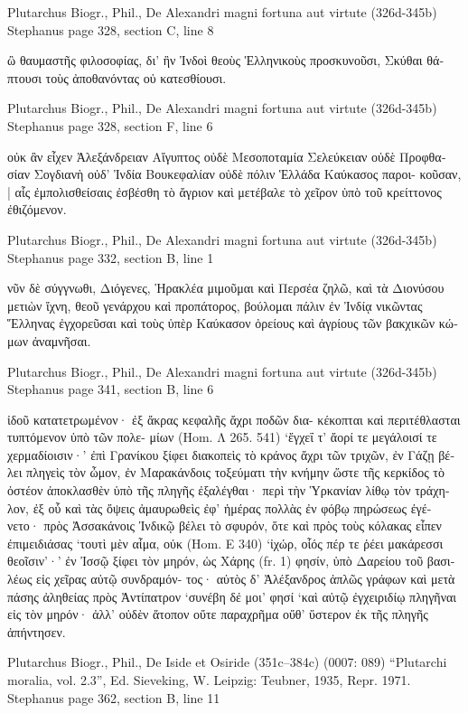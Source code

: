 \documentclass[12pt,letterpaper,twoside,final]{memoir}
\begin{document}
\begin{greek}
Plutarchus Biogr., Phil., De Alexandri magni fortuna aut virtute (326d-345b) 
Stephanus page 328, section C, line 8

             ὢ θαυμαστῆς φιλοσοφίας, δι' ἣν Ἰνδοὶ 
θεοὺς Ἑλληνικοὺς προσκυνοῦσι, Σκύθαι θάπτουσι τοὺς 
ἀποθανόντας οὐ κατεσθίουσι. 



Plutarchus Biogr., Phil., De Alexandri magni fortuna aut virtute (326d-345b) 
Stephanus page 328, section F, line 6

οὐκ ἂν εἶχεν Ἀλεξάνδρειαν Αἴγυπτος οὐδὲ Μεσοποταμία 
Σελεύκειαν οὐδὲ Προφθασίαν Σογδιανὴ οὐδ' Ἰνδία   
Βουκεφαλίαν οὐδὲ πόλιν Ἑλλάδα Καύκασος παροι-
κοῦσαν, | αἷς ἐμπολισθείσαις ἐσβέσθη τὸ ἄγριον καὶ 
μετέβαλε τὸ χεῖρον ὑπὸ τοῦ κρείττονος ἐθιζόμενον. 



Plutarchus Biogr., Phil., De Alexandri magni fortuna aut virtute (326d-345b) 
Stephanus page 332, section B, line 1

             νῦν δὲ σύγγνωθι, Διόγενες, Ἡρακλέα μιμοῦμαι 
καὶ Περσέα ζηλῶ, καὶ τὰ Διονύσου μετιὼν ἴχνη, θεοῦ 
γενάρχου καὶ προπάτορος, βούλομαι πάλιν ἐν Ἰνδίᾳ 
νικῶντας Ἕλληνας ἐγχορεῦσαι καὶ τοὺς ὑπὲρ Καύκασον 
ὀρείους καὶ ἀγρίους τῶν βακχικῶν κώμων ἀναμνῆσαι. 



Plutarchus Biogr., Phil., De Alexandri magni fortuna aut virtute (326d-345b) 
Stephanus page 341, section B, line 6

ἰδοῦ κατατετρωμένον· ἐξ ἄκρας κεφαλῆς ἄχρι ποδῶν δια-
κέκοπται καὶ περιτέθλασται τυπτόμενον ὑπὸ τῶν πολε-
μίων (Hom. Λ 265. 541) ‘ἔγχεΐ τ' ἄορί τε μεγάλοισί τε 
χερμαδίοισιν·’ ἐπὶ Γρανίκου ξίφει διακοπεὶς τὸ κράνος 
ἄχρι τῶν τριχῶν, ἐν Γάζῃ βέλει πληγεὶς τὸν ὦμον, ἐν 
Μαρακάνδοις τοξεύματι τὴν κνήμην ὥστε τῆς κερκίδος 
τὸ ὀστέον ἀποκλασθὲν ὑπὸ τῆς πληγῆς ἐξαλέγθαι· περὶ 
τὴν Ὑρκανίαν λίθῳ τὸν τράχηλον, ἐξ οὗ καὶ τὰς ὄψεις 
ἀμαυρωθεὶς ἐφ' ἡμέρας πολλὰς ἐν φόβῳ πηρώσεως ἐγέ-
νετο· πρὸς Ἀσσακάνοις Ἰνδικῷ βέλει τὸ σφυρόν, ὅτε καὶ 
πρὸς τοὺς κόλακας εἶπεν ἐπιμειδιάσας ‘τουτὶ μὲν αἷμα, 
οὐκ (Hom. Ε 340) ‘ἰχώρ, οἷός πέρ τε ῥέει μακάρεσσι 
θεοῖσιν’·’ ἐν Ἰσσῷ ξίφει τὸν μηρόν, ὡς Χάρης (fr. 1) φησίν, 
ὑπὸ Δαρείου τοῦ βασιλέως εἰς χεῖρας αὐτῷ συνδραμόν-
τος· αὐτὸς δ' Ἀλέξανδρος ἁπλῶς γράφων καὶ μετὰ πάσης   
ἀληθείας πρὸς Ἀντίπατρον ‘συνέβη δέ μοι’ φησί ‘καὶ 
αὐτῷ ἐγχειριδίῳ πληγῆναι εἰς τὸν μηρόν· ἀλλ' οὐδὲν 
ἄτοπον οὔτε παραχρῆμα οὔθ' ὕστερον ἐκ τῆς πληγῆς 
ἀπήντησεν. 



Plutarchus Biogr., Phil., De Iside et Osiride (351c–384c) (0007: 089)
“Plutarchi moralia, vol. 2.3”, Ed. Sieveking, W.
Leipzig: Teubner, 1935, Repr. 1971.
Stephanus page 362, section B, line 11


\end{greek}
\end{document}
